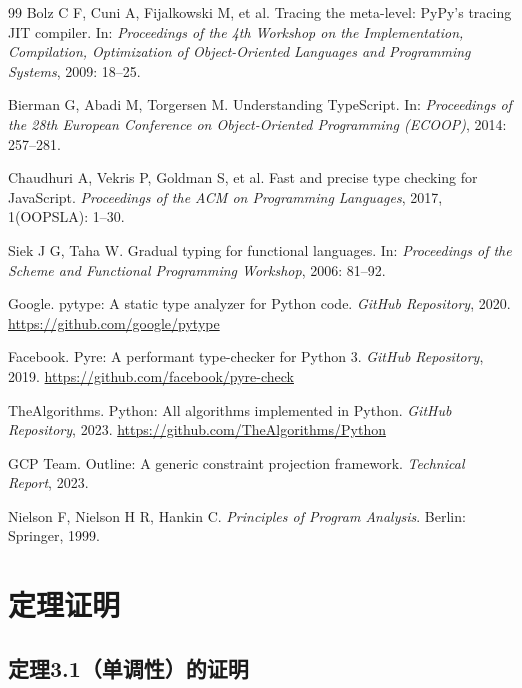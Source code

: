 \documentclass[UTF8]{article}
\begin{document}
\begin{thebibliography}{99}
Bolz C F, Cuni A, Fijalkowski M, et al.
Tracing the meta-level: PyPy's tracing JIT compiler.
In: \textit{Proceedings of the 4th Workshop on the Implementation, Compilation, Optimization of Object-Oriented Languages and Programming Systems}, 2009: 18--25.

Bierman G, Abadi M, Torgersen M.
Understanding TypeScript.
In: \textit{Proceedings of the 28th European Conference on Object-Oriented Programming (ECOOP)}, 2014: 257--281.

Chaudhuri A, Vekris P, Goldman S, et al.
Fast and precise type checking for JavaScript.
\textit{Proceedings of the ACM on Programming Languages}, 2017, 1(OOPSLA): 1--30.

Siek J G, Taha W.
Gradual typing for functional languages.
In: \textit{Proceedings of the Scheme and Functional Programming Workshop}, 2006: 81--92.

Google.
pytype: A static type analyzer for Python code.
\textit{GitHub Repository}, 2020.
\url{https://github.com/google/pytype}

Facebook.
Pyre: A performant type-checker for Python 3.
\textit{GitHub Repository}, 2019.
\url{https://github.com/facebook/pyre-check}

TheAlgorithms.
Python: All algorithms implemented in Python.
\textit{GitHub Repository}, 2023.
\url{https://github.com/TheAlgorithms/Python}

GCP Team.
Outline: A generic constraint projection framework.
\textit{Technical Report}, 2023.

Nielson F, Nielson H R, Hankin C.
\textit{Principles of Program Analysis}.
Berlin: Springer, 1999.

\end{thebibliography}


\appendix

\section{定理证明}

\subsection{定理3.1（单调性）的证明}
\end{document}
